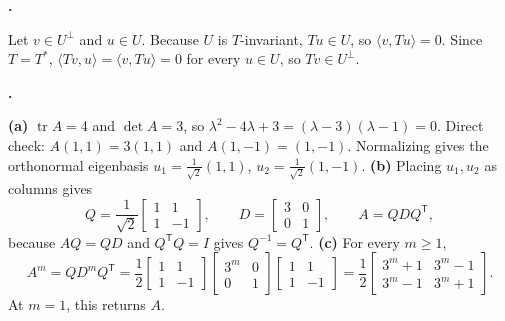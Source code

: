 \documentclass[10pt]{scrartcl}
\DeclareMathOperator{\tr}{tr}\DeclareMathOperator{\nul}{null}\DeclareMathOperator{\range}{range}\DeclareMathOperator{\spn}{span}
\begin{document}
\begin{prob}
  \textbf{. }\par
  \begin{steps}
    \ii Let $v\in U^\perp$ and $u\in U$. Because $U$ is $T$-invariant, $Tu\in U$, so $\langle v,Tu\rangle=0$.
    \ii Since $T=T^*$, $\langle Tv,u\rangle = \langle v,Tu\rangle = 0$ for every $u\in U$, so $Tv\in U^\perp$.
  \end{steps}
\end{prob}

\begin{prob}
  \textbf{. }\par
  \begin{steps}
    \ii \textbf{(a)} $\tr A=4$ and $\det A=3$, so $\lambda^2-4\lambda+3=(\lambda-3)(\lambda-1)=0$. Direct check: $A(1,1)=3(1,1)$ and $A(1,-1)=(1,-1)$. Normalizing gives the orthonormal eigenbasis $u_1=\frac{1}{\sqrt{2}}(1,1)$, $u_2=\frac{1}{\sqrt{2}}(1,-1)$.
    \ii \textbf{(b)} Placing $u_1,u_2$ as columns gives
    \[
      Q = \frac{1}{\sqrt{2}}\begin{bmatrix}1&1\\1&-1\end{bmatrix},\qquad
      D = \begin{bmatrix}3&0\\0&1\end{bmatrix},\qquad
      A = QDQ^{\mathsf T},
    \]
    because $AQ=QD$ and $Q^{\mathsf T}Q=I$ gives $Q^{-1}=Q^{\mathsf T}$.
    \ii \textbf{(c)} For every $m\ge1$,
    \[
      A^m = QD^mQ^{\mathsf T}
      = \frac{1}{2}\begin{bmatrix}1&1\\1&-1\end{bmatrix}\begin{bmatrix}3^m&0\\0&1\end{bmatrix}\begin{bmatrix}1&1\\1&-1\end{bmatrix}
      = \frac{1}{2}\begin{bmatrix}3^m+1&3^m-1\\3^m-1&3^m+1\end{bmatrix}.
    \]
    At $m=1$, this returns $A$.
  \end{steps}
\end{prob}
\end{document}
